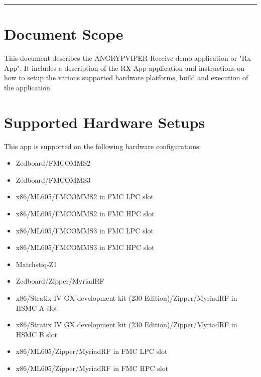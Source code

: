 \newpage
\tableofcontents
\pagebreak
\vspace{1pc}
\hrule
\section{Document Scope}
This document describes the ANGRYPVIPER Receive demo application or "Rx App". It includes a description of the RX App application and instructions on how to setup the various supported hardware platforms, build and execution of the application.

\section{Supported Hardware Setups}
This app is supported on the following hardware configurations:
\begin{itemize}
  \item Zedboard/FMCOMMS2
  \item Zedboard/FMCOMMS3
  \item x86/ML605/FMCOMMS2 in FMC LPC slot
  \item x86/ML605/FMCOMMS2 in FMC HPC slot
  \item x86/ML605/FMCOMMS3 in FMC LPC slot
  \item x86/ML605/FMCOMMS3 in FMC HPC slot
  \item Matchstiq-Z1
  \item Zedboard/Zipper/MyriadRF
  \item x86/Stratix IV GX development kit (230 Edition)/Zipper/MyriadRF in HSMC A slot
  \item x86/Stratix IV GX development kit (230 Edition)/Zipper/MyriadRF in HSMC B slot
  \item x86/ML605/Zipper/MyriadRF in FMC LPC slot
  \item x86/ML605/Zipper/MyriadRF in FMC HPC slot
\end{itemize}


